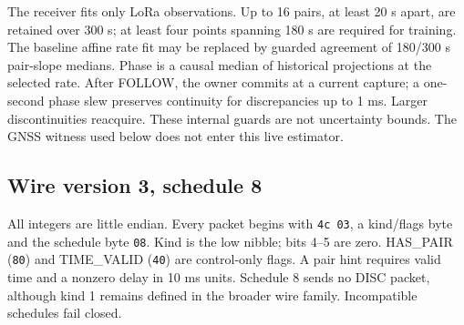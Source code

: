 \documentclass[10pt,letterpaper]{article}
\newcommand{\code}[1]{\texttt{\small #1}}
\begin{document}
The receiver fits only LoRa observations. Up to 16 pairs, at least 20 s apart,
are retained over 300 s; at least four points spanning 180 s are required for
training. The baseline affine rate fit may be replaced by guarded agreement of
180/300 s pair-slope medians. Phase is a causal median of historical projections
at the selected rate. After FOLLOW, the owner commits at a current capture;
a one-second phase slew preserves continuity for discrepancies up to 1 ms.
Larger discontinuities reacquire. These internal guards are not uncertainty
bounds. The GNSS witness used below does not enter this live estimator.

\subsection{Wire version 3, schedule 8}
All integers are little endian. Every packet begins with \code{4c 03}, a
kind/flags byte and the schedule byte \code{08}. Kind is the low nibble;
bits 4--5 are zero. HAS\_PAIR (\code{80}) and TIME\_VALID (\code{40}) are
control-only flags. A pair hint requires valid time and a nonzero delay in
10 ms units. Schedule 8 sends no DISC packet, although kind 1 remains defined
in the broader wire family. Incompatible schedules fail closed.
\end{document}
